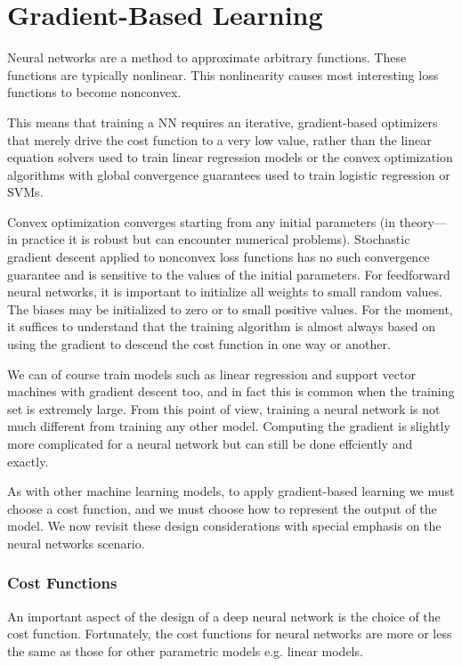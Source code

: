 \chapter{Gradient-Based Learning}
\label{gradient_based_learning}

Neural networks are a method to approximate arbitrary functions. These functions are typically
nonlinear. This nonlinearity  causes most interesting loss functions to become nonconvex.

This means that training a  NN requires an  iterative, gradient-based optimizers that merely drive the cost
function to a very low value, rather than the linear equation solvers used to train
linear regression models or the convex optimization algorithms with global convergence guarantees used to train logistic regression or SVMs. 

Convex optimization converges starting from any initial parameters (in theory—in practice it is robust
but can encounter numerical problems). Stochastic gradient descent applied to
nonconvex loss functions has no such convergence guarantee and is sensitive to the
values of the initial parameters. For feedforward neural networks, it is important to
initialize all weights to small random values. The biases may be initialized to zero
or to small positive values. For the moment, it suffices to understand that the training algorithm
is almost always based on using the gradient to descend the cost function in one
way or another. 


We can of course train models such as linear regression and support vector
machines with gradient descent too, and in fact this is common when the training
set is extremely large. From this point of view, training a neural network is not
much different from training any other model. Computing the gradient is slightly
more complicated for a neural network but can still be done effciently and exactly.

As with other machine learning models, to apply gradient-based learning we
must choose a cost function, and we must choose how to represent the output of
the model. We now revisit these design considerations with special emphasis on
the neural networks scenario.

\subsection{Cost Functions}

An important aspect of the design of a deep neural network is the choice of the
cost function. Fortunately, the cost functions for neural networks are more or less
the same as those for other parametric models e.g. linear models.

